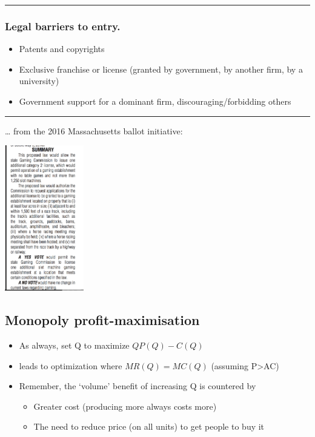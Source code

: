 \documentclass[]{article}
\providecommand{\tightlist}{%
  \setlength{\itemsep}{0pt}\setlength{\parskip}{0pt}}
\begin{document}
\begin{center}\rule{0.5\linewidth}{\linethickness}\end{center}

\hypertarget{legal-barriers-to-entry.}{%
\subsubsection{Legal barriers to
entry.}\label{legal-barriers-to-entry.}}

\begin{itemize}
\tightlist
\item
  Patents and copyrights
\item
  Exclusive franchise or license (granted by government, by another
  firm, by a university)
\item
  Government support for a dominant firm, discouraging/forbidding others
\end{itemize}

\begin{center}\rule{0.5\linewidth}{\linethickness}\end{center}

\ldots{} from the 2016 Massachusetts ballot initiative:

\includegraphics[height=2.5in]{picsfigs/gaming_open.png}

\hypertarget{monopoly-profit-maximisation}{%
\subsection{Monopoly
profit-maximisation}\label{monopoly-profit-maximisation}}

\begin{itemize}
\item
  As always, set Q to maximize \(QP(Q)-C(Q)\)
\item
  leads to optimization where \(MR(Q) = MC(Q)\) (assuming
  P\textgreater AC)
\item
  Remember, the `volume' benefit of increasing Q is countered by

  \begin{itemize}
  \tightlist
  \item
    Greater cost (producing more always costs more)
  \item
    The need to reduce price (on all units) to get people to buy it
  \end{itemize}
\end{itemize}
\end{document}
